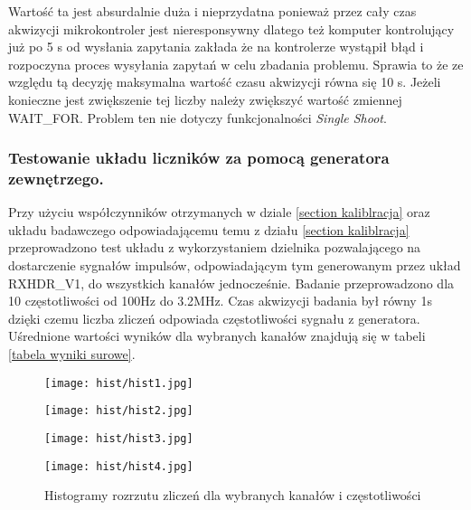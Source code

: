 Wartość ta jest absurdalnie duża i nieprzydatna ponieważ przez cały czas akwizycji mikrokontroler jest nieresponsywny dlatego też komputer kontrolujący już po 5 s od wysłania zapytania zakłada że na kontrolerze wystąpił błąd i rozpoczyna proces wysyłania zapytań w celu zbadania problemu. Sprawia to że ze względu tą decyzję maksymalna wartość czasu akwizycji równa się 10 s. Jeżeli konieczne jest zwiększenie tej liczby należy zwiększyć wartość zmiennej WAIT\_FOR. Problem ten nie dotyczy funkcjonalności \textit{Single Shoot}.   

\subsubsection{Testowanie układu liczników za pomocą generatora zewnętrzego.}

Przy użyciu współczynników otrzymanych w dziale \ref{section kaliblracja} oraz układu badawczego odpowiadającemu temu z działu \ref{section kaliblracja} przeprowadzono test układu z wykorzystaniem dzielnika pozwalającego na dostarczenie sygnałów impulsów, odpowiadającym tym generowanym przez układ RXHDR\_V1, do wszystkich kanałów jednocześnie.
Badanie przeprowadzono dla 10 częstotliwości od 100Hz do 3.2MHz. Czas akwizycji badania był równy 1s dzięki czemu liczba zliczeń odpowiada częstotliwości sygnału z generatora. Uśrednione wartości wyników dla wybranych kanałów znajdują się w tabeli \ref{tabela wyniki surowe}.

\begin{figure}
        \begin{multicols}{2}
            \texttt{[image: hist/hist1.jpg]} \par    
            \texttt{[image: hist/hist2.jpg]} \par    
        \end{multicols} \hfill
        \begin{multicols}{2}
            \texttt{[image: hist/hist3.jpg]} \par
            \texttt{[image: hist/hist4.jpg]} \par    
        \end{multicols}
        \caption{Histogramy rozrzutu zliczeń dla wybranych kanałów i częstotliwości}
        \label{hist licz}
\end{figure}

